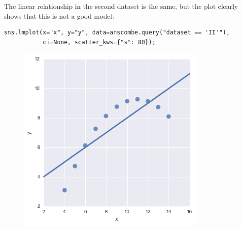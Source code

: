 \documentclass{beamer}
\begin{document}
\begin{frame}[fragile]
\large	
The linear relationship in the second dataset is the same, but the plot clearly shows that this is not a good model:
\begin{framed}
	\begin{verbatim}
sns.lmplot(x="x", y="y", data=anscombe.query("dataset == 'II'"),
           ci=None, scatter_kws={"s": 80});
                  \end{verbatim}
                \end{framed}
\begin{figure}
	\centering
	\includegraphics[width=0.7\linewidth]{images/regression_21_0}

\end{figure}


\end{frame}
\end{document}
